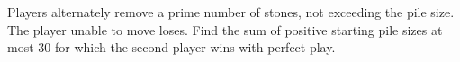 Players alternately remove a prime number of stones, not exceeding the pile size. The player unable to move loses. Find the sum of positive starting pile sizes at most $30$ for which the second player wins with perfect play.

